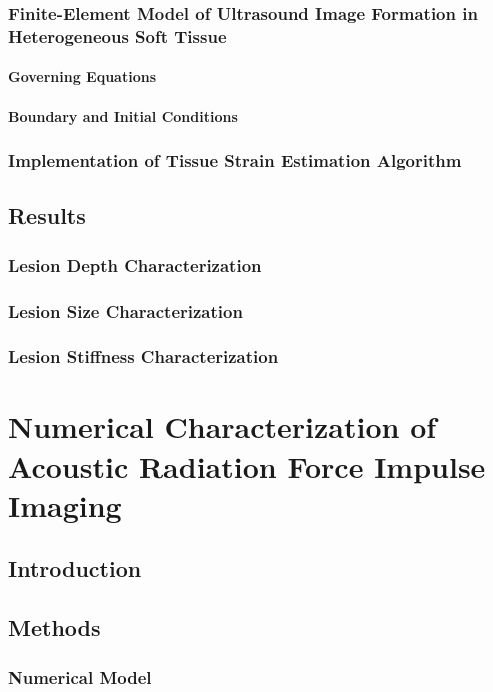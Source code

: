 \documentclass[12pt]{book}
\begin{document}
		\subsection{Finite-Element Model of Ultrasound Image Formation in Heterogeneous Soft Tissue}
			\subsubsection{Governing Equations}
			\subsubsection{Boundary and Initial Conditions}
		\subsection{Implementation of Tissue Strain Estimation Algorithm}
	\section{Results}
		\subsection{Lesion Depth Characterization}
		\subsection{Lesion Size Characterization}
		\subsection{Lesion Stiffness Characterization}

\chapter{Numerical Characterization of Acoustic Radiation Force Impulse Imaging}
	\section{Introduction}
	\section{Methods}
		\subsection{Numerical Model}
\end{document}

